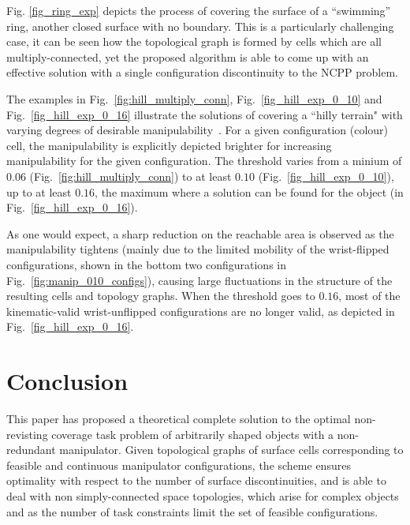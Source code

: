 \documentclass[journal]{IEEEtran}
\begin{document}
Fig. \ref{fig_ring_exp} depicts the process of covering the surface of a ``swimming'' ring, another closed surface with no boundary. 
This is a particularly challenging case, it can be seen how the topological graph is formed by cells which are all multiply-connected, 
yet the proposed algorithm is able to come up with an effective solution with a single configuration discontinuity to the NCPP problem. 

The examples in Fig.~\ref{fig:hill_multiply_conn}, Fig.~\ref{fig_hill_exp_0_10} and Fig.~\ref{fig_hill_exp_0_16} illustrate the solutions of covering a ``hilly terrain" with varying degrees of desirable manipulability~\cite{yoshikawa1990translational}. 
For a given configuration (colour) cell, the manipulability is explicitly depicted brighter for increasing manipulability for the given configuration. The threshold  varies from a minium of $0.06$ (Fig.~\ref{fig:hill_multiply_conn}) to at least $0.10$ (Fig.~\ref{fig_hill_exp_0_10}), up to at least $0.16$, the maximum where a solution can be found for the object (in Fig.~\ref{fig_hill_exp_0_16}).

As one would expect, a sharp reduction on the reachable area is observed as the manipulability tightens 
(mainly due to the limited mobility of the wrist-flipped configurations, shown in the bottom two configurations 
in Fig.~\ref{fig:manip_010_configs}), causing large fluctuations in the structure of the resulting cells and topology graphs. When the threshold goes to $0.16$, most of the kinematic-valid wrist-unflipped configurations are no longer valid, as depicted in Fig.~\ref{fig_hill_exp_0_16}. %

\vfill

\section{Conclusion}
\label{section_conclusion}
This paper has proposed a theoretical complete solution to the optimal non-revisting coverage task problem of arbitrarily shaped objects with a non-redundant manipulator. 
Given topological graphs of surface cells corresponding to feasible and continuous manipulator configurations, 
the scheme ensures optimality with respect to the number of surface discontinuities, and is able to deal with non simply-connected 
space topologies, which arise for complex objects and as the number of task constraints limit the set of feasible configurations. 
\end{document}
